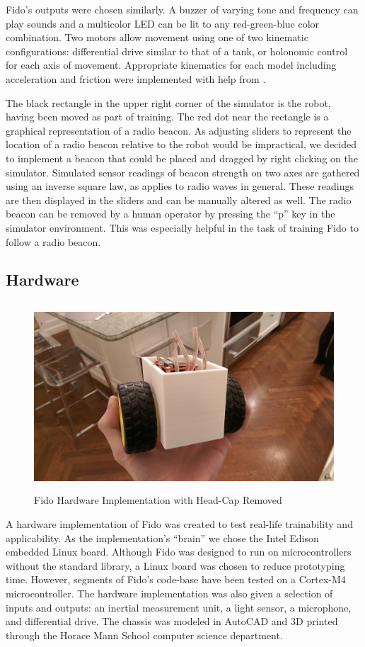 Fido's outputs were chosen similarly.  A buzzer of varying tone and frequency can play sounds and a multicolor LED can be lit to any red-green-blue color combination. Two motors allow movement using one of two kinematic configurations: differential drive similar to that of a tank, or holonomic control for each axis of movement.  Appropriate kinematics for each model including acceleration and friction were implemented with help from \cite{dudek}.

The black rectangle in the upper right corner of the simulator is the robot, having been moved as part of training.  The red dot near the rectangle is a graphical representation of a radio beacon.  As adjusting sliders to represent the location of a radio beacon relative to the robot would be impractical, we decided to implement a beacon that could be placed and dragged by right clicking on the simulator.  Simulated sensor readings of beacon strength on two axes are gathered using an inverse square law, as applies to radio waves in general.  These readings are then displayed in the sliders and can be manually altered as well.  The radio beacon can be removed by a human operator by pressing the ``p'' key in the simulator environment.  This was especially helpful in the task of training Fido to follow a radio beacon.

\subsection{Hardware}

\begin{figure}
	\centering
	\includegraphics[height=7cm]{Figures/Prototype.jpg}
	\caption{Fido Hardware Implementation with Head-Cap Removed}
\end{figure}


A hardware implementation of Fido was created to test real-life trainability and applicability.   As the implementation's ``brain'' we chose the Intel Edison embedded Linux board.  Although Fido was designed to run on microcontrollers without the standard library, a Linux board was chosen to reduce prototyping time.  However, segments of Fido's code-base have been tested on a Cortex-M4 microcontroller.   The hardware implementation was also given a selection of inputs and outputs: an inertial measurement unit, a light sensor, a microphone, and differential drive.   The chassis was modeled in AutoCAD and 3D printed through the Horace Mann School computer science department.

